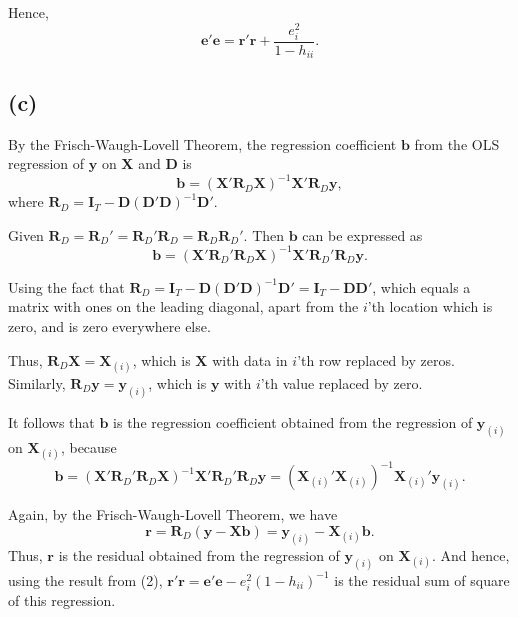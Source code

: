 \documentclass[
]{article}
\begin{document}
Hence,
\[\boldsymbol{e}'\boldsymbol{e} = \boldsymbol{r}'\boldsymbol{r} + \frac{e_i^2}{1-h_{ii}}. \]

\hypertarget{c}{%
\subsection{(c)}\label{c}}

By the Frisch-Waugh-Lovell Theorem, the regression coefficient
\(\boldsymbol{b}\) from the OLS regression of \(\boldsymbol{y}\) on
\(\boldsymbol{X}\) and \(\boldsymbol{D}\) is
\[\boldsymbol{b} = (\boldsymbol{X}'\boldsymbol{R}_D\boldsymbol{X})^{-1}\boldsymbol{X}'\boldsymbol{R}_D\boldsymbol{y},\]
where
\(\boldsymbol{R}_D = \boldsymbol{I}_T - \boldsymbol{D}(\boldsymbol{D}'\boldsymbol{D})^{-1}\boldsymbol{D}'\).

Given
\(\boldsymbol{R}_D = \boldsymbol{R}_D'=\boldsymbol{R}_D'\boldsymbol{R}_D = \boldsymbol{R}_D\boldsymbol{R}_D'\).
Then \(\boldsymbol{b}\) can be expressed as
\[\boldsymbol{b} = (\boldsymbol{X}'\boldsymbol{R}_D'\boldsymbol{R}_D\boldsymbol{X})^{-1}\boldsymbol{X}'\boldsymbol{R}_D'\boldsymbol{R}_D\boldsymbol{y}.\]

Using the fact that
\(\boldsymbol{R}_D = \boldsymbol{I}_T - \boldsymbol{D}(\boldsymbol{D}'\boldsymbol{D})^{-1}\boldsymbol{D}' = \boldsymbol{I}_T - \boldsymbol{D}\boldsymbol{D}'\),
which equals a matrix with ones on the leading diagonal, apart from the
\(i\)'th location which is zero, and is zero everywhere else.

Thus, \(\boldsymbol{R}_D\boldsymbol{X} = \boldsymbol{X}_{(i)}\), which
is \(\boldsymbol{X}\) with data in \(i\)'th row replaced by zeros.
Similarly, \(\boldsymbol{R}_D\boldsymbol{y} = \boldsymbol{y}_{(i)}\),
which is \(\boldsymbol{y}\) with \(i\)'th value replaced by zero.

It follows that \(\boldsymbol{b}\) is the regression coefficient
obtained from the regression of \(\boldsymbol{y}_{(i)}\) on
\(\boldsymbol{X}_{(i)}\), because
\[\boldsymbol{b} = (\boldsymbol{X}'\boldsymbol{R}_D'\boldsymbol{R}_D\boldsymbol{X})^{-1}\boldsymbol{X}'\boldsymbol{R}_D'\boldsymbol{R}_D\boldsymbol{y} = (\boldsymbol{X}_{(i)}'\boldsymbol{X}_{(i)})^{-1}\boldsymbol{X}_{(i)}'\boldsymbol{y}_{(i)}.\]

Again, by the Frisch-Waugh-Lovell Theorem, we have
\[\boldsymbol{r} = \boldsymbol{R}_D(\boldsymbol{y}-\boldsymbol{X}\boldsymbol{b}) = \boldsymbol{y}_{(i)}-\boldsymbol{X}_{(i)}\boldsymbol{b}.\]
Thus, \(\boldsymbol{r}\) is the residual obtained from the regression of
\(\boldsymbol{y}_{(i)}\) on \(\boldsymbol{X}_{(i)}\). And hence, using
the result from (2),
\(\boldsymbol{r}'\boldsymbol{r} = \boldsymbol{e}'\boldsymbol{e}-e_i^2(1-h_{ii})^{-1}\)
is the residual sum of square of this regression.
\end{document}
